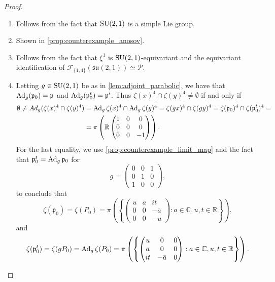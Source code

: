 \documentclass{report}
\begin{document}
\begin{proof}
\begin{enumerate}[label=(\roman*)]
\item Follows from the fact that $\operatorname{{\mathrm{SU}}}(2,1)$ is a simple Lie group.
\item Shown in \cref{prop:counterexample_anosov}.
\item Follows from the fact that $\xi^1$ is $\operatorname{{\mathrm{SU}}}(2,1)$-equivariant and the equivariant identification of $\mathcal F_{\{1, 4 \}}(\mathfrak{su}(2,1)) \simeq \mathcal P$.
\item Letting $g\in \operatorname{{\mathrm{SU}}}(2,1)$ be as in \cref{lem:adjoint_parabolic}, we have that $\operatorname{Ad}_g(\mathfrak p_0) = \mathfrak p$ and $\operatorname{Ad}_g(\mathfrak p_0^t) = \mathfrak p'$.
Thus $\zeta(x)^4 \cap \zeta(y)^4 \neq \emptyset$ if and only if
\begin{align*}
    \emptyset \neq Ad_g (\zeta(x)^4 \cap \zeta(y)^4) &=
    \operatorname{Ad}_g \zeta(x)^4 \cap \operatorname{Ad}_g \zeta(y)^4 = 
    \zeta(g x)^4 \cap \zeta(g y)^4 =
    \zeta(\mathfrak p_0)^4 \cap \zeta(\mathfrak p_0^t)^4=\\
    &= \pi \left( \mathbb R \begin{pmatrix} 1 & 0 & 0 \\ 0 & 0 & 0 \\ 0 & 0 & -1 \end{pmatrix}\right).
\end{align*}
For the last equality, we use \cref{prop:counterexample_limit_map} and the fact that $\mathfrak p_0^t = \operatorname{Ad}_g \mathfrak p_0$ for 
$$g = \begin{pmatrix} 0 & 0 & 1 \\ 0 & 1 & 0 \\ 1 & 0 & 0 \end{pmatrix},$$
to conclude that
\[
\zeta(\mathfrak p_0) = 
\zeta(P_0) = 
\pi\left(
\left\{
\begin{pmatrix} u & a & it \\ 0 & 0 & - \bar a \\ 0 & 0 & -u \end{pmatrix} :
a \in \mathbb C, u, t \in \mathbb R
\right\}
\right),
\]
and
\[
\zeta(\mathfrak p_0^t) = 
\zeta(g P_0) = \operatorname{Ad}_g \zeta(P_0) =
\pi\left(
\left\{
\begin{pmatrix} u & 0 & 0 \\ a & 0 & 0 \\ i t & - \bar a & 0 \end{pmatrix} :
a \in \mathbb C, u, t \in \mathbb R
\right\}
\right).
\]
\end{enumerate}
\end{proof}

\printbibliography
\end{document}

